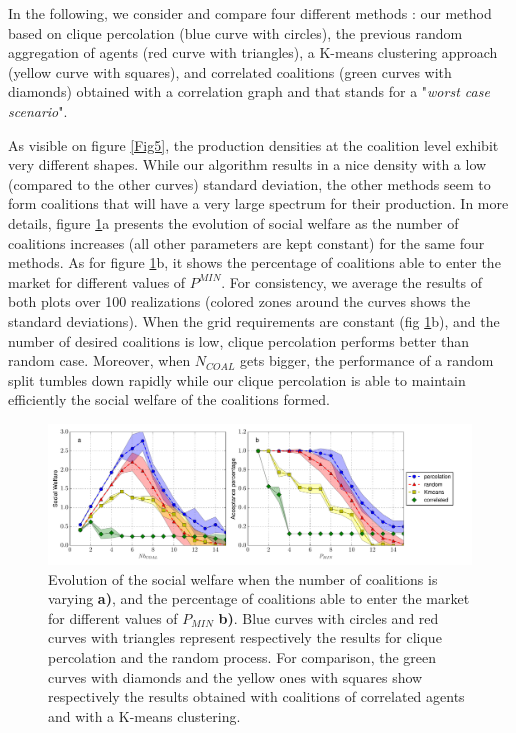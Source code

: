 \documentclass[conference]{IEEEtran}
\begin{document}
In the following, we consider and compare four different methods : our method based on clique percolation (blue curve with circles), the previous random aggregation of agents (red curve with triangles), a K-means clustering approach (yellow curve with squares), and correlated coalitions (green curves with diamonds) obtained with a correlation graph and that stands for a "\textit{worst case scenario}".

As visible on figure \ref{Fig5}, the production densities at the coalition level exhibit very different shapes. While our algorithm results in a nice density with a low (compared to the other curves) standard deviation, the other methods seem to form coalitions that will have a very large spectrum for their production. In more details, figure \ref{Fig4}a presents the evolution of social welfare as the number of coalitions increases (all other parameters are kept constant) for the same four methods. As for figure \ref{Fig4}b, it shows the percentage of coalitions able to enter the market for different values of $ P^{MIN} $. For consistency, we average the results of both plots over 100 realizations (colored zones around the curves shows the standard deviations). When the grid requirements are constant (fig \ref{Fig4}b), and the number of desired coalitions is low, clique percolation performs better than random case. Moreover, when $ N_{COAL} $ gets bigger, the performance of a random split tumbles down rapidly while our clique percolation is able to maintain efficiently the social welfare of the coalitions formed.

\begin{figure}
\begin{minipage}[c]{\textwidth}
	\begin{center}
  		\includegraphics[scale=0.45]{figure10/perc2.pdf}
  			\caption{Evolution of the social welfare when the number of coalitions is varying \textbf{a)}, and the percentage of coalitions able to enter the market for different values of $ P_{MIN} $ \textbf{b)}. Blue curves with circles and red curves with triangles represent respectively the results for clique percolation and the random process. For comparison, the green curves with diamonds and the yellow ones with squares show respectively the results obtained with coalitions of correlated agents and with a K-means clustering.}
 		\label{Fig4}
	\end{center}
\end{minipage}

\end{figure}
\end{document}
